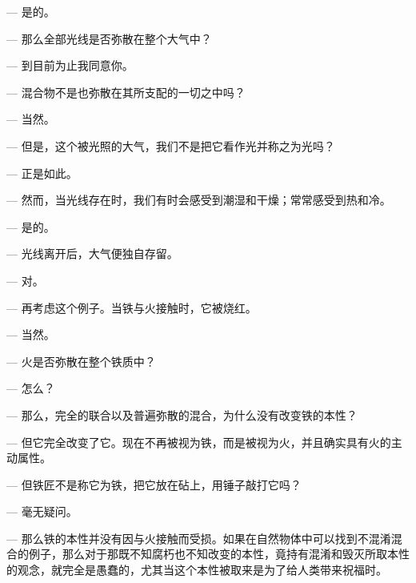— 是的。\par

— 那么全部光线是否弥散在整个大气中？\par

— 到目前为止我同意你。\par

— 混合物不是也弥散在其所支配的一切之中吗？\par

— 当然。\par

— 但是，这个被光照的大气，我们不是把它看作光并称之为光吗？\par

— 正是如此。\par

— 然而，当光线存在时，我们有时会感受到潮湿和干燥；常常感受到热和冷。\par

— 是的。\par

— 光线离开后，大气便独自存留。\par

— 对。\par

— 再考虑这个例子。当铁与火接触时，它被烧红。\par

— 当然。\par

— 火是否弥散在整个铁质中？\par

— 怎么？\par

— 那么，完全的联合以及普遍弥散的混合，为什么没有改变铁的本性？\par

— 但它完全改变了它。现在不再被视为铁，而是被视为火，并且确实具有火的主动属性。\par

— 但铁匠不是称它为铁，把它放在砧上，用锤子敲打它吗？\par

— 毫无疑问。\par

— 那么铁的本性并没有因与火接触而受损。如果在自然物体中可以找到不混淆混合的例子，那么对于那既不知腐朽也不知改变的本性，竟持有混淆和毁灭所取本性的观念，就完全是愚蠢的，尤其当这个本性被取来是为了给人类带来祝福时。\par

